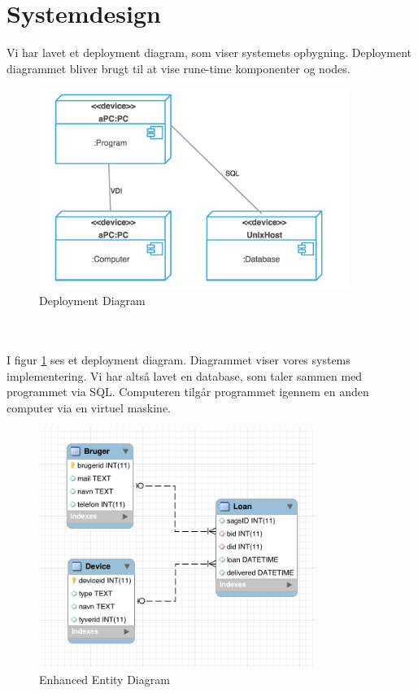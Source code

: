 \documentclass[a4paper]{article}
\begin{document}
\section{Systemdesign}
Vi har lavet et deployment diagram, som viser systemets opbygning. Deployment diagrammet bliver brugt til at vise rune-time komponenter og nodes. \cite[p~256]{OOSE}
\begin{figure}[h!]
\includegraphics[width=0.9\textwidth]{deploymentdiagram}
  \caption{Deployment Diagram}
    \label{fig:DEP}
  \centering
\end{figure} \\ \\
I figur \ref{fig:DEP} ses et deployment diagram. Diagrammet viser vores systems implementering. Vi har altså lavet en database, som taler sammen med programmet via SQL. Computeren tilgår programmet igennem en anden computer via en virtuel maskine. \\
\begin{figure}[h!]
\includegraphics[width=0.8\textwidth]{EERDiagram}
  \caption{Enhanced Entity Diagram}
  \label{fig:EER}
  \centering
\end{figure} \\
\end{document}
